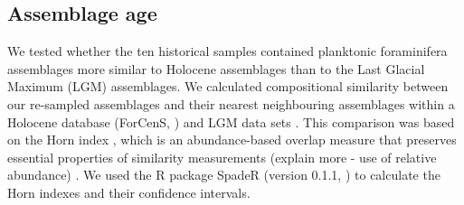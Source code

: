 \documentclass[a4paper]{article}
\begin{document}
\begin{table}
\caption{Sediments re-sampled for the bias analysis. Year: sediment collection year. N(forams) is the number of planktonic foraminifera picked}
\label{table:samples} 
\centering
\setlength{\tabcolsep}{0.2cm}
\end{table}


\subsection{Assemblage age}

We tested whether the ten historical samples contained planktonic foraminifera assemblages more similar to Holocene assemblages than to the Last Glacial Maximum (LGM) assemblages.
We calculated compositional similarity between our re-sampled assemblages and their nearest neighbouring assemblages within a Holocene database (ForCenS, \citealt{siccha2017forcens}) and LGM data sets \citep{kucera2005reconstruction}. 
This comparison was based on the Horn index \citep{horn1966measurement}, which is an abundance-based overlap measure that preserves essential properties of similarity measurements (explain more - use of relative abundance) \citep{jost2011compositional}. We used the R package SpadeR (version 0.1.1,  \citealt{rpack2016spadeR}) to calculate the Horn indexes and their confidence intervals.
\end{document}
